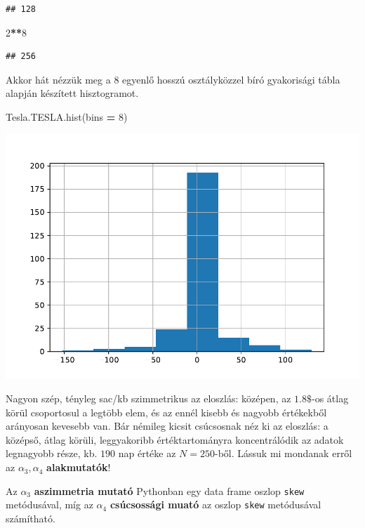 \documentclass[
]{book}
\newenvironment{Shaded}{\begin{snugshade}}{\end{snugshade}}
\newcommand{\DecValTok}[1]{\textcolor[rgb]{0.00,0.00,0.81}{#1}}
\newcommand{\NormalTok}[1]{#1}
\newcommand{\OperatorTok}[1]{\textcolor[rgb]{0.81,0.36,0.00}{\textbf{#1}}}
\begin{document}
\begin{verbatim}
## 128
\end{verbatim}

\begin{Shaded}
\begin{Highlighting}[]
\DecValTok{2}\OperatorTok{**}\DecValTok{8}
\end{Highlighting}
\end{Shaded}

\begin{verbatim}
## 256
\end{verbatim}

Akkor hát nézzük meg a 8 egyenlő hosszú osztályközzel bíró gyakorisági tábla alapján készített hisztogramot.

\begin{Shaded}
\begin{Highlighting}[]
\NormalTok{Tesla.TESLA.hist(bins }\OperatorTok{=} \DecValTok{8}\NormalTok{)}
\end{Highlighting}
\end{Shaded}

\includegraphics{_main_files/figure-latex/unnamed-chunk-149-33.pdf}

Nagyon szép, tényleg sac/kb szimmetrikus az eloszlás: középen, az \(1.8\$\)-os átlag körül csoportosul a legtöbb elem, és az ennél kisebb és nagyobb értékekből arányosan kevesebb van. Bár némileg kicsit csúcsosnak néz ki az eloszlás: a középső, átlag körüli, leggyakoribb értéktartományra koncentrálódik az adatok legnagyobb része, kb. \(190\) nap értéke az \(N=250\)-ből. Lássuk mi mondanak erről az \(\alpha_3, \alpha_4\) \textbf{alakmutatók}!

Az \(\alpha_3\) \textbf{aszimmetria mutató} Pythonban egy data frame oszlop \texttt{skew} metódusával, míg az \(\alpha_4\) \textbf{csúcsossági muató} az oszlop \texttt{skew} metódusával számítható.
\end{document}
